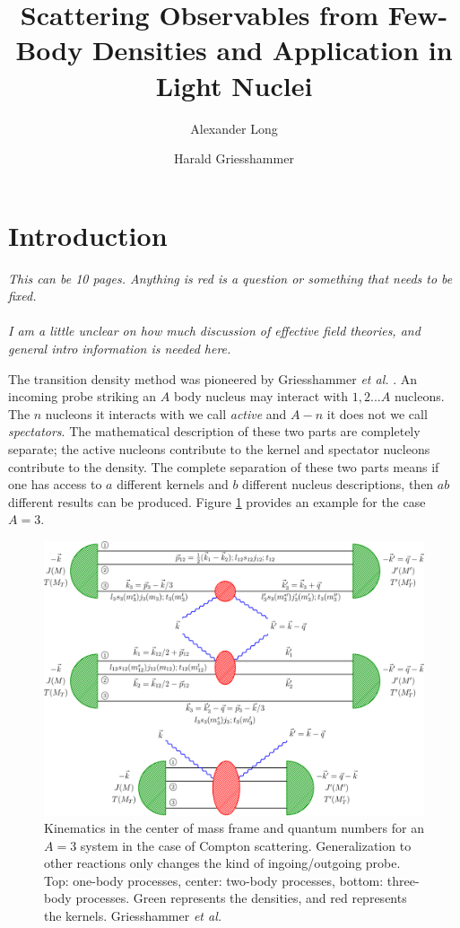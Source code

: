 \documentclass[a4paper,11pt]{article}
\title{Scattering Observables from Few-Body Densities and Application
in Light Nuclei}
\author*[a]{Alexander Long}
\author[a]{Harald Griesshammer}
\affiliation[a]{The George Washington University\\ Washington DC USA}
\newcommand{\etal}{\textit{et al.}}
\newcommand{\ques}[1]{\color{red}\textit{ #1 }\color{black}}
\begin{document}
\maketitle

\section{Introduction}
\ques{This can be 10 pages. Anything is red is a question or
  something that needs to be fixed.\\~\\ I am a little unclear on how
  much discussion of effective field theories, and general intro
  information is needed here.
}

The transition density method was pioneered by Griesshammer \etal
\cite{hammer2020}.
An incoming probe striking an $A$ body nucleus may interact with
$1,2...A$ nucleons.
The $n$ nucleons it interacts with we call \textit{active} and $A-n$
it does not we call \textit{spectators}.
The mathematical description of these two parts are completely
separate; the active nucleons contribute to the kernel and spectator
nucleons contribute to the density.
The complete separation of these two parts means if one has access to
$a$ different kernels and $b$ different nucleus descriptions, then
$ab$ different results can be produced.
Figure \ref{fig:onetwobod} provides an example for the case $A=3$.

\begin{figure}[h!]
  \begin{center}
    \includegraphics[scale=0.7]{kinematics3He.pdf}
    \caption{Kinematics in the center of mass frame and quantum
      numbers for an $A=3$ system in the case of Compton scattering.
      Generalization to other reactions only changes the kind of
      ingoing/outgoing probe. Top: one-body processes, center: two-body
      processes, bottom: three-body processes. Green represents the
      densities, and red represents the kernels. Griesshammer \etal
    \cite{hammer2020}}
    \label{fig:onetwobod}
  \end{center}
\end{figure}
\end{document}
